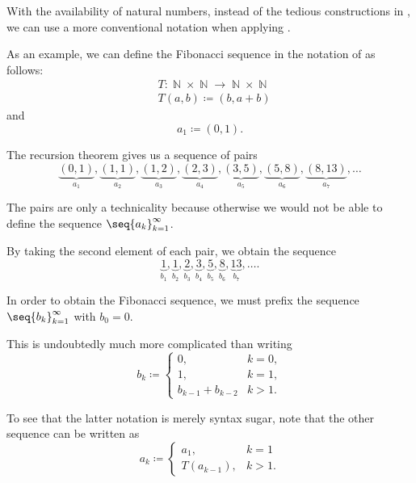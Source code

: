 \begin{remark}\label{rem:natural_number_recursion}
  With the availability of natural numbers, instead of the tedious constructions in , we can use a more conventional notation when applying .

  As an example, we can define the Fibonacci sequence in the notation of  as follows:
  \begin{equation*}
    \begin{aligned}
      &T: \BbbN \times \BbbN \to \BbbN \times \BbbN \\
      &T(a, b) \coloneqq (b, a + b)
    \end{aligned}
  \end{equation*}
  and
  \begin{equation*}
    a_1 \coloneqq (0, 1).
  \end{equation*}

  The recursion theorem gives us a sequence of pairs
  \begin{equation*}
    \underbrace{(0, 1)}_{a_1}, \underbrace{(1, 1)}_{a_2}, \underbrace{(1, 2)}_{a_3}, \underbrace{(2, 3)}_{a_4}, \underbrace{(3, 5)}_{a_5}, \underbrace{(5, 8)}_{a_6}, \underbrace{(8, 13)}_{a_7}, \ldots
  \end{equation*}

  The pairs are only a technicality because otherwise we would not be able to define the sequence \( \seq{ a_k }_{k=1}^\infty \).

  By taking the second element of each pair, we obtain the sequence
  \begin{equation*}
    \underbrace{1}_{b_1}, \underbrace{1}_{b_2}, \underbrace{2}_{b_3}, \underbrace{3}_{b_4}, \underbrace{5}_{b_5}, \underbrace{8}_{b_6}, \underbrace{13}_{b_7}, \ldots.
  \end{equation*}

  In order to obtain the Fibonacci sequence, we must prefix the sequence \( \seq{ b_k }_{k=1}^\infty \) with \( b_0 = 0 \).

  This is undoubtedly much more complicated than writing
  \begin{equation*}
    b_k \coloneqq \begin{cases}
      0,                &k = 0, \\
      1,                &k = 1, \\
      b_{k-1} + b_{k-2} &k > 1.
    \end{cases}
  \end{equation*}

  To see that the latter notation is merely syntax sugar, note that the other sequence can be written as
  \begin{equation*}
    a_k \coloneqq \begin{cases}
      a_1,        &k = 1 \\
      T(a_{k-1}), &k > 1.
    \end{cases}
  \end{equation*}
\end{remark}
